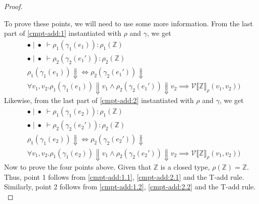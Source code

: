 \documentclass[twoside,11pt,openright]{report}
\theoremstyle{definition}
\newcommand{\expr}{e}
\newcommand{\val}{v}
\newcommand{\Tint}{\mathbb{Z}}
\newcommand{\empvenv}{\bullet}
\newcommand{\emptenv}{\bullet}
\newcommand{\jdg}[4]{#1 \; | \; #2 \; \vdash #3 : #4}
\newcommand{\ValInp}[2]{\mathcal{V} \llbracket #1 \rrbracket_{#2}}
\newcommand{\ValInpGen}[2]{\ValInp{#1}{#2}(\val_1, \val_2)}
\begin{document}
\begin{proof}
\begin{enumerate}
  \end{enumerate}
  To prove these points, we will need to use some more information. From the last part of \ref*{cmpt-add:1} instantiated with $\rho$ and $\gamma$, we get
  \begin{align}
    &\jdg{\emptenv}{\empvenv}{\rho_1(\gamma_1(\expr_1))}{\rho_1(\Tint)}\label{cmpt-add:1.1}\\
    &\jdg{\emptenv}{\empvenv}{\rho_2(\gamma_2(\expr_1'))}{\rho_2(\Tint)}\label{cmpt-add:1.2}\\
    &\rho_1(\gamma_1(\expr_1)) \Downarrow \iff \rho_2(\gamma_2(\expr_1')) \Downarrow\label{cmpt-add:1.3}\\
    &\forall \val_1, \val_2 . \rho_1(\gamma_1(\expr_1)) \Downarrow \val_1 \land \rho_2(\gamma_2(\expr_1')) \Downarrow \val_2 \implies \ValInpGen{\Tint}{\rho})\label{cmpt-add:1.4}
  \end{align}
  Likewise, from the last part of \ref*{cmpt-add:2} instantiated with $\rho$ and $\gamma$, we get
  \begin{align}
    &\jdg{\emptenv}{\empvenv}{\rho_1(\gamma_1(\expr_2))}{\rho_1(\Tint)}\label{cmpt-add:2.1}\\
    &\jdg{\emptenv}{\empvenv}{\rho_2(\gamma_2(\expr_2'))}{\rho_2(\Tint)}\label{cmpt-add:2.2}\\
    &\rho_1(\gamma_1(\expr_2)) \Downarrow \iff \rho_2(\gamma_2(\expr_2')) \Downarrow\label{cmpt-add:2.3}\\
    &\forall \val_1, \val_2 . \rho_1(\gamma_1(\expr_2)) \Downarrow \val_1 \land \rho_2(\gamma_2(\expr_2')) \Downarrow \val_2 \implies \ValInpGen{\Tint}{\rho})\label{cmpt-add:2.4}
  \end{align}
  Now to prove the four points above. Given that $\Tint$ is a closed type, $\rho(\Tint) = \Tint$. Thus, point 1 follows from \ref*{cmpt-add:1.1}, \ref*{cmpt-add:2.1} and the T-add rule. Similarly, point 2 follows from \ref*{cmpt-add:1.2}, \ref*{cmpt-add:2.2} and the T-add rule.\\

\end{proof}
\end{document}
